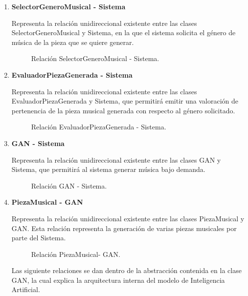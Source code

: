 \begin{enumerate}
  \item \textbf{SelectorGeneroMusical - Sistema}

  Representa la relación unidireccional existente entre las clases SelectorGeneroMusical y Sistema, en la que el sistema solicita el género de música de la pieza que se quiere generar.

  \begin{figure}[H]
    \centering
    
    \caption{Relación SelectorGeneroMusical - Sistema.}
  \end{figure}

  \item \textbf{EvaluadorPiezaGenerada - Sistema}

  Representa la relación unidireccional existente entre las clases EvaluadorPiezaGenerada y Sistema, que permitirá emitir una valoración de pertenencia de la pieza musical generada con respecto al género solicitado.

  \begin{figure}[H]
    \centering
    
    \caption{Relación EvaluadorPiezaGenerada - Sistema.}
  \end{figure}

  \item \textbf{GAN - Sistema}

  Representa la relación unidireccional existente entre las clases GAN y Sistema, que permitirá al sistema generar música bajo demanda.

  \begin{figure}[H]
    \centering
    
    \caption{Relación GAN - Sistema.}
  \end{figure}

  \item \textbf{PiezaMusical - GAN}

  Representa la relación unidireccional existente entre las clases PiezaMusical y GAN. Esta relación representa la generación de varias piezas musicales por parte del Sistema.

  \begin{figure}[H]
    \centering
    
    \caption{Relación PiezaMusical- GAN.}
  \end{figure}

  Las siguiente relaciones se dan dentro de la abstracción contenida en la clase GAN, la cual explica la arquitectura interna del modelo de Inteligencia Artificial.


\end{enumerate}
